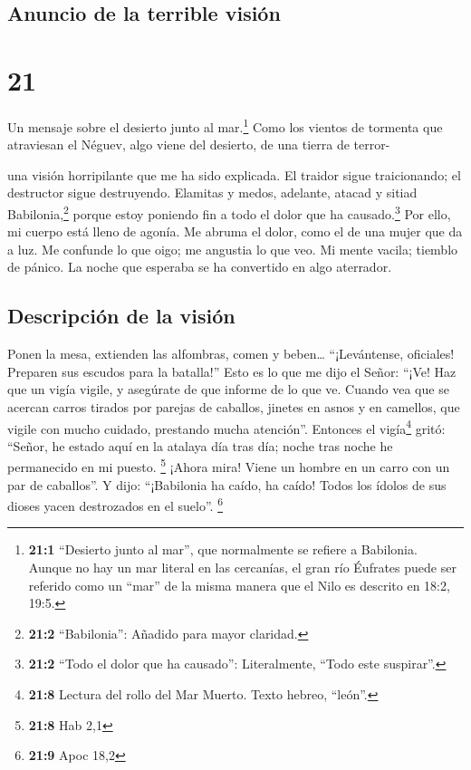 \hypertarget{anuncio-de-la-terrible-visiuxf3n}{%
\subsection{Anuncio de la terrible
visión}\label{anuncio-de-la-terrible-visiuxf3n}}

\hypertarget{section-20}{%
\section{21}\label{section-20}}

 Un mensaje sobre el desierto junto al mar.\footnote{\textbf{21:1}
  ``Desierto junto al mar'', que normalmente se refiere a Babilonia.
  Aunque no hay un mar literal en las cercanías, el gran río Éufrates
  puede ser referido como un ``mar'' de la misma manera que el Nilo es
  descrito en 18:2, 19:5.} Como los vientos de tormenta que atraviesan
el Néguev, algo viene del desierto, de una tierra de terror-

 una visión horripilante que me ha sido explicada. El
traidor sigue traicionando; el destructor sigue destruyendo. Elamitas y
medos, adelante, atacad y sitiad Babilonia,\footnote{\textbf{21:2}
  ``Babilonia'': Añadido para mayor claridad.} porque estoy poniendo fin
a todo el dolor que ha causado.\footnote{\textbf{21:2} ``Todo el dolor
  que ha causado'': Literalmente, ``Todo este suspirar''.}
 Por ello, mi cuerpo está lleno de agonía. Me abruma el
dolor, como el de una mujer que da a luz. Me confunde lo que oigo; me
angustia lo que veo.  Mi mente vacila; tiemblo de pánico.
La noche que esperaba se ha convertido en algo aterrador.

\hypertarget{descripciuxf3n-de-la-visiuxf3n}{%
\subsection{Descripción de la
visión}\label{descripciuxf3n-de-la-visiuxf3n}}

 Ponen la mesa, extienden las alfombras, comen y
beben\ldots{} ``¡Levántense, oficiales! Preparen sus escudos para la
batalla!''  Esto es lo que me dijo el Señor: ``¡Ve! Haz
que un vigía vigile, y asegúrate de que informe de lo que ve.
 Cuando vea que se acercan carros tirados por parejas de
caballos, jinetes en asnos y en camellos, que vigile con mucho cuidado,
prestando mucha atención''.  Entonces el vigía\footnote{\textbf{21:8}
  Lectura del rollo del Mar Muerto. Texto hebreo, ``león''.} gritó:
``Señor, he estado aquí en la atalaya día tras día; noche tras noche he
permanecido en mi puesto. \footnote{\textbf{21:8} Hab 2,1}
 ¡Ahora mira! Viene un hombre en un carro con un par de
caballos''. Y dijo: ``¡Babilonia ha caído, ha caído! Todos los ídolos de
sus dioses yacen destrozados en el suelo''. \footnote{\textbf{21:9} Apoc
  18,2}

